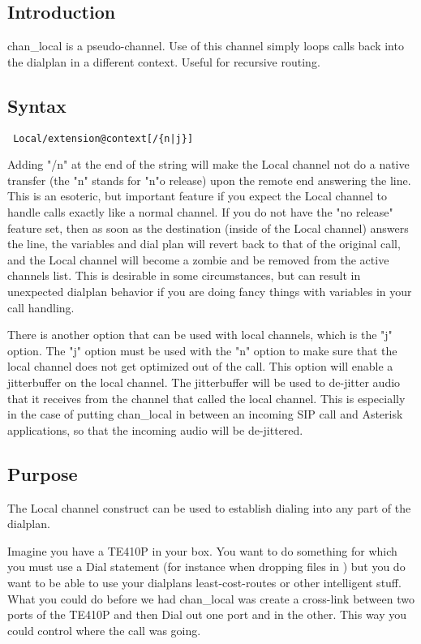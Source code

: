 \subsection{Introduction}

chan\_local is a pseudo-channel. Use of this channel simply loops calls back
into the dialplan in a different context. Useful for recursive routing.

\subsection{Syntax}
\begin{verbatim}
 Local/extension@context[/{n|j}]
\end{verbatim}

Adding "/n" at the end of the string will make the Local channel not do a
native transfer (the "n" stands for "n"o release) upon the remote end answering
the line. This is an esoteric, but important feature if you expect the Local
channel to handle calls exactly like a normal channel. If you do not have the
"no release" feature set, then as soon as the destination (inside of the Local
channel) answers the line, the variables and dial plan will revert back to that
of the original call, and the Local channel will become a zombie and be removed
from the active channels list. This is desirable in some circumstances, but can
result in unexpected dialplan behavior if you are doing fancy things with
variables in your call handling.

There is another option that can be used with local channels, which is the "j"
option.  The "j" option must be used with the "n" option to make sure that the
local channel does not get optimized out of the call.  This option will enable
a jitterbuffer on the local channel.  The jitterbuffer will be used to de-jitter
audio that it receives from the channel that called the local channel.  This is
especially in the case of putting chan\_local in between an incoming SIP call
and Asterisk applications, so that the incoming audio will be de-jittered.

\subsection{Purpose}

The Local channel construct can be used to establish dialing into any part of
the dialplan.

Imagine you have a TE410P in your box. You want to do something for which you
must use a Dial statement (for instance when dropping files in
) but you do want to be able to use your dialplans
least-cost-routes or other intelligent stuff. What you could do before we had
chan\_local was create a cross-link between two ports of the TE410P and then
Dial out one port and in the other. This way you could control where the call
was going.

